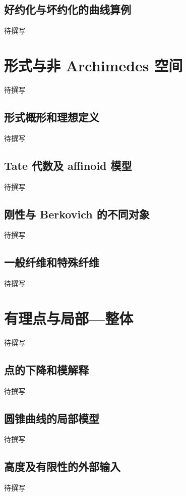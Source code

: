 \subsection{好约化与坏约化的曲线算例}
\label{g5:subsec:A01:03}
待撰写

\section{形式与非 Archimedes 空间}
\label{g5:sec:A02}
待撰写

\subsection{形式概形和理想定义}
\label{g5:subsec:A02:01}
待撰写

\subsection{Tate 代数及 affinoid 模型}
\label{g5:subsec:A02:02}
待撰写

\subsection{刚性与 Berkovich 的不同对象}
\label{g5:subsec:A02:03}
待撰写

\subsection{一般纤维和特殊纤维}
\label{g5:subsec:A02:04}
待撰写

\section{有理点与局部—整体}
\label{g5:sec:A03}
待撰写

\subsection{点的下降和模解释}
\label{g5:subsec:A03:01}
待撰写

\subsection{圆锥曲线的局部模型}
\label{g5:subsec:A03:02}
待撰写

\subsection{高度及有限性的外部输入}
\label{g5:subsec:A03:03}
待撰写

